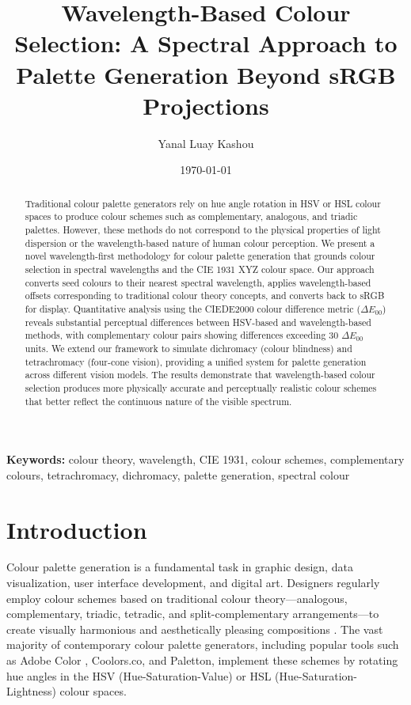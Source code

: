\documentclass[12pt,a4paper]{article}
\title{Wavelength-Based Colour Selection: A Spectral Approach to Palette Generation Beyond sRGB Projections}
\author{Yanal Luay Kashou}
\date{\today}
\newcommand{\deltaE}{\Delta E_{00}}
\begin{document}
\maketitle

\begin{abstract}
Traditional colour palette generators rely on hue angle rotation in HSV or HSL colour spaces to produce colour schemes such as complementary, analogous, and triadic palettes. However, these methods do not correspond to the physical properties of light dispersion or the wavelength-based nature of human colour perception. We present a novel wavelength-first methodology for colour palette generation that grounds colour selection in spectral wavelengths and the CIE 1931 XYZ colour space. Our approach converts seed colours to their nearest spectral wavelength, applies wavelength-based offsets corresponding to traditional colour theory concepts, and converts back to sRGB for display. Quantitative analysis using the CIEDE2000 colour difference metric ($\deltaE$) reveals substantial perceptual differences between HSV-based and wavelength-based methods, with complementary colour pairs showing differences exceeding 30 $\deltaE$ units. We extend our framework to simulate dichromacy (colour blindness) and tetrachromacy (four-cone vision), providing a unified system for palette generation across different vision models. The results demonstrate that wavelength-based colour selection produces more physically accurate and perceptually realistic colour schemes that better reflect the continuous nature of the visible spectrum.
\end{abstract}

\textbf{Keywords:} colour theory, wavelength, CIE 1931, colour schemes, complementary colours, tetrachromacy, dichromacy, palette generation, spectral colour

\section{Introduction}

Colour palette generation is a fundamental task in graphic design, data visualization, user interface development, and digital art. Designers regularly employ colour schemes based on traditional colour theory—analogous, complementary, triadic, tetradic, and split-complementary arrangements—to create visually harmonious and aesthetically pleasing compositions \cite{itten1961art,munsell1969notation}. The vast majority of contemporary colour palette generators, including popular tools such as Adobe Color \cite{adobe2023color}, Coolors.co, and Paletton, implement these schemes by rotating hue angles in the HSV (Hue-Saturation-Value) or HSL (Hue-Saturation-Lightness) colour spaces.
\end{document}
